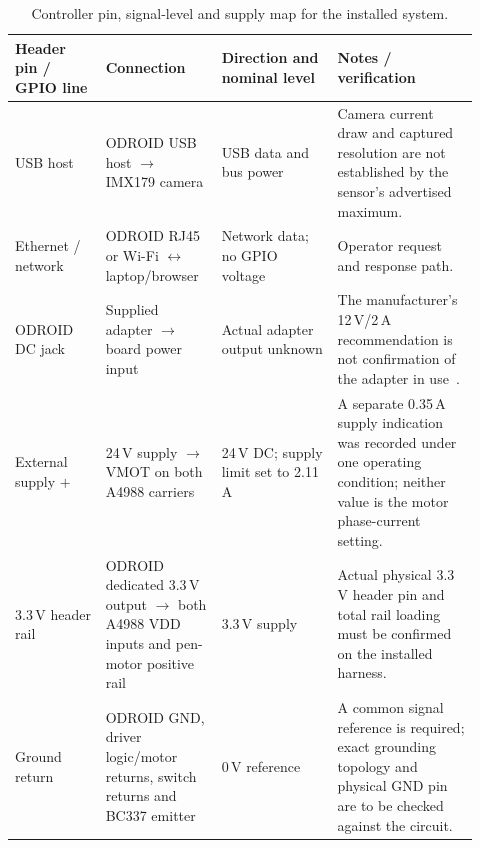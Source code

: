 \begin{table}[!htbp]\centering\small
\setlength{\tabcolsep}{3pt}\renewcommand{\arraystretch}{1.03}
\begin{tabular}{p{0.18\linewidth}p{0.22\linewidth}p{0.23\linewidth}p{0.29\linewidth}}\toprule
\textbf{Header pin / GPIO line} & \textbf{Connection} & \textbf{Direction and nominal level} & \textbf{Notes / verification}\\\midrule
USB host & ODROID USB host $\rightarrow$ IMX179 camera & USB data and bus power & Camera current draw and captured resolution are not established by the sensor's advertised maximum.\\
Ethernet / network & ODROID RJ45 or Wi-Fi $\leftrightarrow$ laptop/browser & Network data; no GPIO voltage & Operator request and response path.\\
ODROID DC jack & Supplied adapter $\rightarrow$ board power input & Actual adapter output unknown & The manufacturer's 12\,V/2\,A recommendation is not confirmation of the adapter in use~\cite[``Power'' section, unpaginated]{odroidn2ds}.\\
External supply $+$ & 24\,V supply $\rightarrow$ VMOT on both A4988 carriers & 24\,V DC; supply limit set to 2.11\,A & A separate 0.35\,A supply indication was recorded under one operating condition; neither value is the motor phase-current setting.\\
3.3\,V header rail & ODROID dedicated 3.3\,V output $\rightarrow$ both A4988 VDD inputs and pen-motor positive rail & 3.3\,V supply & Actual physical 3.3\,V header pin and total rail loading must be confirmed on the installed harness.\\
Ground return & ODROID GND, driver logic/motor returns, switch returns and BC337 emitter & 0\,V reference & A common signal reference is required; exact grounding topology and physical GND pin are to be checked against the circuit.\\
\bottomrule\end{tabular}
\caption{Controller pin, signal-level and supply map for the installed system.}\label{tab:des-pin-map}
\end{table}

